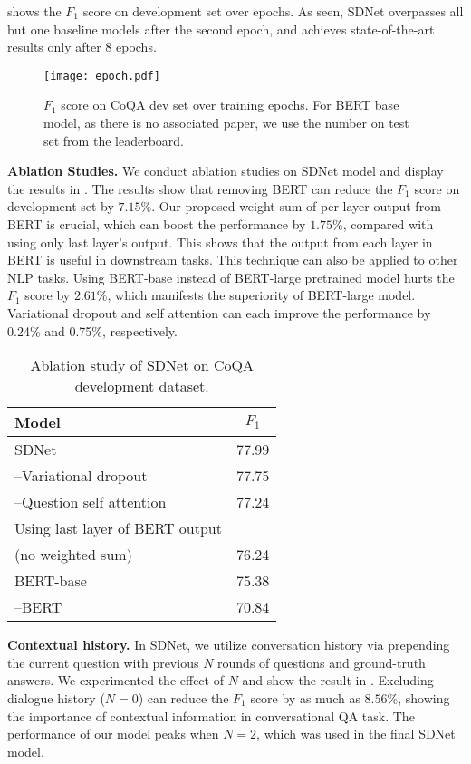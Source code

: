 \documentclass{article} \usepackage{sdnet,times}
\begin{document}
 shows the $F_1$ score on development set over epochs. As seen, SDNet overpasses all but one baseline models after the second epoch, and achieves state-of-the-art results only after 8 epochs.  

\begin{figure*}[t]
\centering
\texttt{[image: epoch.pdf]}
\vspace{-1\baselineskip}
\caption{$F_1$ score on CoQA dev set over training epochs. For BERT base model, as there is no associated paper, we use the number on test set from the leaderboard.}
\label{fig:epoch}
\end{figure*}

\textbf{Ablation Studies.} We conduct ablation studies on SDNet model and display the results in . The results show that removing BERT can reduce the $F_1$ score on development set by $7.15\%$. Our proposed weight sum of per-layer output from BERT is crucial, which can boost the performance by $1.75\%$, compared with using only last layer's output. This shows that the output from each layer in BERT is useful in downstream tasks. This technique can also be applied to other NLP tasks. Using BERT-base instead of BERT-large pretrained model hurts the $F_1$ score by $2.61\%$, which manifests the superiority of BERT-large model. Variational dropout and self attention can each improve the performance by 0.24\% and 0.75\%, respectively.


\begin{table}[t]
\centering
\caption{Ablation study of SDNet on CoQA development dataset.}
\label{table:ablation}
\begin{tabular}{lc}
\toprule
Model & $F_1$ \\ 
\midrule
\midrule
SDNet & 77.99 \\
\quad --Variational dropout & 77.75 \\
\quad --Question self attention & 77.24 \\
\quad Using last layer of BERT output &  \\
\quad (no weighted sum) & 76.24 \\
\quad BERT-base & 75.38 \\
\quad --BERT & 70.84 \\
\bottomrule
\end{tabular}
\end{table}

\textbf{Contextual history.} In SDNet, we utilize conversation history via prepending the current question with previous $N$ rounds of questions and ground-truth answers. We experimented the effect of $N$ and show the result in . Excluding dialogue history ($N=0$) can reduce the $F_1$ score by as much as $8.56\%$, showing the importance of contextual information in conversational QA task.
The performance of our model peaks when $N=2$, which was used in the final SDNet model.
\end{document}
